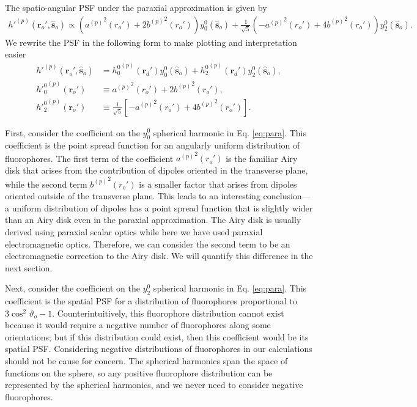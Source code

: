 \documentclass[11pt]{article}
\providecommand{\ro}[1]{\mathbf{\mathbf{r}}_o}
\providecommand{\so}[1]{\mathbf{\hat{s}}_o}
\providecommand{\rd}[1]{\mathbf{r}_d}
\begin{document}
The spatio-angular PSF under the paraxial approximation is given by
\begin{align}
      h'^{(p)}(\ro{}', \so{}) \propto \left({a^{(p)}}^2(r_o') + 2{b^{(p)}}^2(r_o')\right)y_0^0(\so{}) + \frac{1}{\sqrt{5}}\left(-{a^{(p)}}^2(r_o') + {4b^{(p)}}^2(r_o')\right)y_2^{0}(\so{})\label{eq:para}.
\end{align}
We rewrite the PSF in the following form to make plotting and interpretation easier
\begin{align}
  h'^{(p)}(\ro{}', \so{}) &= {h_0^0}^{(p)}(\rd{}')y_0^0(\so{}) + {h_2^0}^{(p)}(\rd{}')y_2^0(\so{}), \label{eq:concisepsf}\\
  {{h'}_0^0}^{(p)}(\ro{}') &\equiv {a^{(p)}}^2(r_o') + 2{b^{(p)}}^2(r_o'),\\
  {{h'}_2^0}^{(p)}(\ro{}') &\equiv \frac{1}{\sqrt{5}}\left[- {a^{(p)}}^2(r_o') + 4{b^{(p)}}^2(r_o')\right]. 
\end{align}

First, consider the coefficient on the $y_0^0$ spherical harmonic in Eq.
\ref{eq:para}. This coefficient is the point spread function for an angularly
uniform distribution of fluorophores. The first term of the coefficient
${a^{(p)}}^2(r_o')$ is the familiar Airy disk that arises from the contribution
of dipoles oriented in the transverse plane, while the second term
${b^{(p)}}^2(r_o')$ is a smaller factor that arises from dipoles oriented
outside of the transverse plane. This leads to an interesting conclusion---a
uniform distribution of dipoles has a point spread function that is slightly
wider than an Airy disk even in the paraxial approximation. The Airy disk is
usually derived using paraxial scalar optics while here we have used paraxial
electromagnetic optics. Therefore, we can consider the second term to be an
electromagnetic correction to the Airy disk. We will quantify this difference in
the next section.

Next, consider the coefficient on the $y_2^0$ spherical harmonic in
Eq. \ref{eq:para}. This coefficient is the spatial PSF for a distribution of
fluorophores proportional to $3\cos^2\vartheta_o - 1$. Counterintuitively, this
fluorophore distribution cannot exist because it would require a negative number
of fluorophores along some orientations; but if this distribution could exist,
then this coefficient would be its spatial PSF. Considering negative
distributions of fluorophores in our calculations should not be cause for
concern. The spherical harmonics span the space of functions on the sphere, so
any positive fluorophore distribution can be represented by the spherical
harmonics, and we never need to consider negative fluorophores.
    
\end{document}
